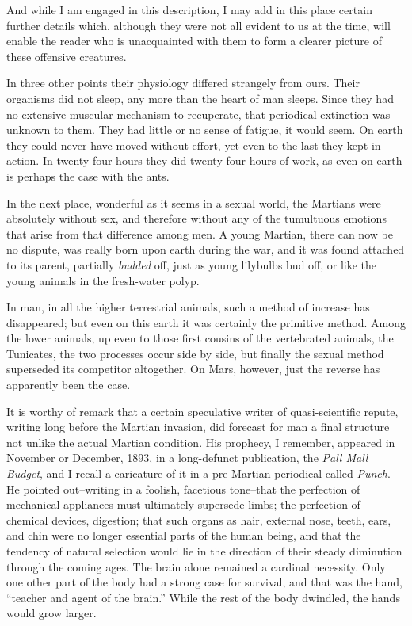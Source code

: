 And while I am engaged in this description, I may add in this place
certain further details which, although they were not all evident
to us at the time, will enable the reader who is unacquainted with
them to form a clearer picture of these offensive creatures.

In three other points their physiology differed strangely from
ours. Their organisms did not sleep, any more than the heart of man
sleeps. Since they had no extensive muscular mechanism to
recuperate, that periodical extinction was unknown to them. They
had little or no sense of fatigue, it would seem. On earth they
could never have moved without effort, yet even to the last they
kept in action. In twenty-four hours they did twenty-four hours of
work, as even on earth is perhaps the case with the ants.

In the next place, wonderful as it seems in a sexual world, the
Martians were absolutely without sex, and therefore without any of
the tumultuous emotions that arise from that difference among men.
A young Martian, there can now be no dispute, was really born upon
earth during the war, and it was found attached to its parent,
partially \emph{budded} off, just as young lilybulbs bud off, or
like the young animals in the fresh-water polyp.

In man, in all the higher terrestrial animals, such a method of
increase has disappeared; but even on this earth it was certainly
the primitive method. Among the lower animals, up even to those
first cousins of the vertebrated animals, the Tunicates, the two
processes occur side by side, but finally the sexual method
superseded its competitor altogether. On Mars, however, just the
reverse has apparently been the case.

It is worthy of remark that a certain speculative writer of
quasi-scientific repute, writing long before the Martian invasion,
did forecast for man a final structure not unlike the actual
Martian condition. His prophecy, I remember, appeared in November
or December, 1893, in a long-defunct publication, the
\emph{Pall Mall Budget}, and I recall a caricature of it in a
pre-Martian periodical called \emph{Punch}. He pointed out--writing
in a foolish, facetious tone--that the perfection of mechanical
appliances must ultimately supersede limbs; the perfection of
chemical devices, digestion; that such organs as hair, external
nose, teeth, ears, and chin were no longer essential parts of the
human being, and that the tendency of natural selection would lie
in the direction of their steady diminution through the coming
ages. The brain alone remained a cardinal necessity. Only one other
part of the body had a strong case for survival, and that was the
hand, ``teacher and agent of the brain.'' While the rest of the body
dwindled, the hands would grow larger.


